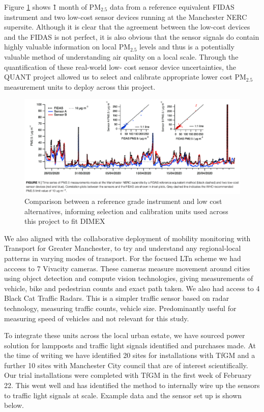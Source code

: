 \documentclass{article}
\begin{document}
\noindent Figure \ref{fig::QUANT} shows \~1 month of PM$_{2.5}$ data from a reference equivalent FIDAS instrument and two low-cost sensor devices running at the Manchester NERC supersite. Although it is clear that the agreement between the low-cost devices and the FIDAS is not perfect, it is also obvious that the sensor signals do contain highly valuable information on local PM$_{2.5}$ levels and thus is a potentially valuable method of understanding air quality on a local scale. Through the quantification of these real-world low- cost sensor device uncertainties, the QUANT project allowed us to select and calibrate appropriate lower cost PM$_{2.5}$ measurement units to deploy across this project.\\

\begin{figure}
	\centering
	\includegraphics[width=0.95\linewidth]{Figures/QUANT_DIMEX.png}		
	\caption{Comparison between a reference grade instrument and low cost alternatives, informing selection and calibration units used across this project to fit DIMEX} \label{fig::QUANT}
\end{figure}

\noindent We also aligned with the collaborative deployment of mobility monitoring with Transport for Greater Manchester, to try and understand any regional-local patterns in varying modes of transport. For the focused LTn scheme we had acccess to 7 Vivacity cameras. These cameras measure movement around cities using object detection and compute vision technologies, giving measurements of vehicle, bike and pedestrian counts and exact path taken.
We also had access to 4 Black Cat Traffic Radars. This is a simpler traffic sensor based on radar technology, measuring traffic counts,
vehicle size. Predominantly useful for measuring speed of vehicles and not relevant for this study.

\noindent To integrate these units across the local urban estate, we have sourced power solution for lampposts and traffic light signals identified and purchases made. At the time of writing we have identified 20 sites for installations with TfGM and a further 10 sites with Manchester City council that are of interest scientifically. Our trial installations were completed with TfGM in the first week of February 22. This went well and has identified the method to internally wire up the sensors to traffic light signals at scale. Example data and the sensor set up is shown below. 
\end{document}
